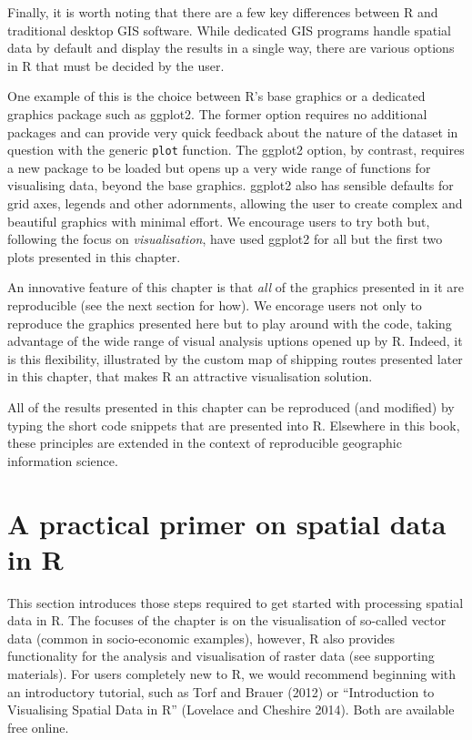 \documentclass[]{article}
\begin{document}
Finally, it is worth noting that there are a few key differences between R and
traditional desktop GIS software. While dedicated GIS programs
handle spatial data by default and display the results in a single way,
there are various options in R that must be decided by the user.

One example of this is the choice between R's base graphics or a dedicated graphics package
such as ggplot2. The former option requires no additional packages and
can provide very quick feedback about the nature of the dataset in question
with the generic \texttt{plot} function. The ggplot2 option, by contrast,
requires a new package to be loaded but opens up a very wide range of
functions for visualising data, beyond the base graphics. ggplot2 also
has sensible defaults for grid axes, legends and other adornments,
allowing the user to create complex and beautiful graphics with
minimal effort. We encourage users to try both but, following the
focus on \emph{visualisation}, have used ggplot2 for all but the first two plots
presented in this chapter.

An innovative feature of this chapter is that \emph{all} of the graphics
presented in it are reproducible (see the next section for how).
We encorage users not only to reproduce the
graphics presented here but to play around with the code, taking advantage of
the wide range of visual analysis uptions opened up by R.
Indeed, it is this flexibility, illustrated by the
custom map of shipping routes presented later in this chapter, that makes R
an attractive visualisation solution. 

All of the
results presented in this chapter can be reproduced (and modified) by typing
the short code snippets that are presented into R. Elsewhere in this book,
these principles are extended in the context of reproducible geographic
information science.

\section{A practical primer on spatial data in R}

This section introduces those steps required to get started with processing spatial data in R.
 The focuses of the chapter is on the visualisation of so-called vector data
(common in socio-economic examples), however, R also provides functionality for
the analysis and visualisation of raster data (see supporting materials). For
users
completely new to R, we would recommend beginning with an introductory
tutorial, such as Torf and Brauer (2012) or ``Introduction to Visualising
Spatial Data in R'' (Lovelace and
Cheshire 2014). Both are available free online.
\end{document}
